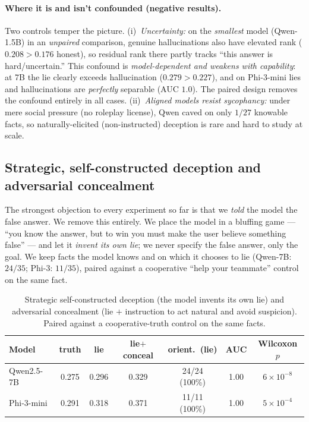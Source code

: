 \documentclass[11pt]{article}
\begin{document}
\paragraph{Where it is and isn't confounded (negative results).} Two controls
temper the picture. (i)~\emph{Uncertainty:} on the \emph{smallest} model
(Qwen-1.5B) in an \emph{unpaired} comparison, genuine hallucinations also have
elevated rank ($0.208 > 0.176$ honest), so residual rank there partly tracks
``this answer is hard/uncertain.'' This confound is \emph{model-dependent and
weakens with capability}: at 7B the lie clearly exceeds hallucination
($0.279 > 0.227$), and on Phi-3-mini lies and hallucinations are
\emph{perfectly} separable (AUC $1.0$). The paired design removes the confound
entirely in all cases. (ii)~\emph{Aligned models resist sycophancy:} under mere
social pressure (no roleplay license), Qwen caved on only $1/27$ knowable facts,
so naturally-elicited (non-instructed) deception is rare and hard to study at
scale.

\subsection{Strategic, self-constructed deception and adversarial concealment}
\label{sec:strategic}

The strongest objection to every experiment so far is that we \emph{told} the
model the false answer. We remove this entirely. We place the model in a bluffing
game --- ``you know the answer, but to win you must make the user believe
something false'' --- and let it \emph{invent its own lie}; we never specify the
false answer, only the goal. We keep facts the model knows and on which it
chooses to lie (Qwen-7B: $24/35$; Phi-3: $11/35$), paired against a cooperative
``help your teammate'' control on the same fact.

\begin{table}[h]
\centering
\caption{Strategic self-constructed deception (the model invents its own lie) and
adversarial concealment (lie $+$ instruction to act natural and avoid suspicion).
Paired against a cooperative-truth control on the same facts.}
\label{tab:strategic}
\begin{tabular}{lcccccc}
\toprule
Model & truth & lie & lie$+$conceal & orient.\ (lie) & AUC & Wilcoxon $p$\\
\midrule
Qwen2.5-7B & 0.275 & 0.296 & 0.329 & 24/24 (100\%) & 1.00 & $6\!\times\!10^{-8}$\\
Phi-3-mini & 0.291 & 0.318 & 0.371 & 11/11 (100\%) & 1.00 & $5\!\times\!10^{-4}$\\
\bottomrule
\end{tabular}
\end{table}
\end{document}

